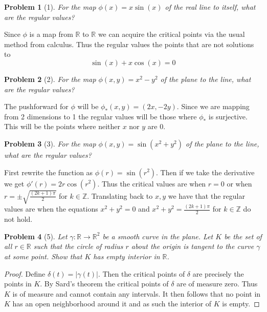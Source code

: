 \documentclass[10pt]{article}
\newcommand{\sk}{\vskip 10mm}
\newcommand{\bb}[1]{\mathbb{#1}}
\theoremstyle{plain}
\newtheorem{problem}{Problem}
\theoremstyle{remark}
\begin{document}
\begin{problem}[1]
  For the map $\phi(x)=x\sin(x)$ of the real line to itself,
  what are the regular values?
\end{problem}

Since $\phi$ is a map from $\bb{R}$ to $\bb{R}$ we can acquire
the critical points via the usual method from calculus.
Thus the regular values the points that are not solutions to
\[
  \sin(x)+x\cos(x) =0
\]

\sk

\begin{problem}[2]
  For the map $\phi(x,y)=x^2-y^2$ of the plane to the line, what
  are the regular values?
\end{problem}

The pushforward for $\phi$ will be $\phi_*(x,y)=(2x,-2y)$. Since we are
mapping from 2 dimensions to 1 the regular values will
be those where $\phi_*$ is surjective. This will be the points
where neither $x$ nor $y$ are 0.

\sk

\begin{problem}[3]
  For the map $\phi(x,y)=\sin(x^2+y^2)$ of the plane to the line,
  what are the regular values?
\end{problem}

First rewrite the function as $\phi(r)=\sin(r^2)$. Then if
we take the derivative we get $\phi'(r)=2r\cos(r^2)$. Thus
the critical values are when $r=0$ or when $r=\pm\sqrt{\frac{(2k+1)\pi}{2}}$
for $k\in \bb{Z}$. Translating back to $x,y$ we have that the
regular values are when the equations $x^2+y^2=0$ and
$x^2+y^2=\frac{(2k+1)\pi}{2}$ for $k\in \bb{Z}$ do not hold.

\sk

\begin{problem}[5]
  Let $\gamma:\bb{R}\rightarrow\bb{R}^2$ be a smooth curve in the plane.
  Let $K$ be the set of all $r\in \bb{R}$ such that the circle of
  radius $r$ about the origin is tangent to the curve $\gamma$ at
  some point. Show that $K$ has empty interior in $\bb{R}$.
\end{problem}

\begin{proof}
  Define $\delta(t)=|\gamma(t)|$. Then the critical points of
  $\delta$ are precisely the points in $K$. By Sard's theorem
  the critical points of $\delta$ are of measure zero. Thus
  $K$ is of measure and cannot contain any intervals. It
  then follows that no point in $K$ has an open neighborhood
  around it and as such the interior of $K$ is empty.
\end{proof}
\end{document}
